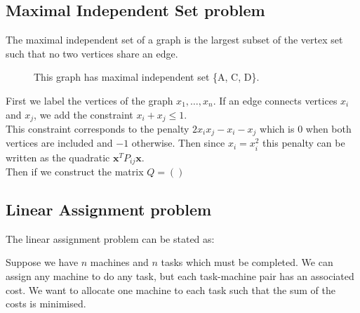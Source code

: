 \documentclass{article}
\begin{document}
\subsection{Maximal Independent Set problem}

\noindent The maximal independent set of a graph is the largest subset of the vertex set such that no two vertices share an edge. 

\begin{figure}[H]
    \centering
    \caption{This graph has maximal independent set \{A, C, D\}.}
\end{figure}

\noindent First we label the vertices of the graph \(x_1, \dots,  x_n\). If an edge connects vertices \(x_i\) and \(x_j\), we add the constraint \(x_i + x_j \leq 1\). \\

\noindent This constraint corresponds to the penalty \(2x_ix_j - x_i - x_j\) which is \(0\) when both vertices are included and \(-1\) otherwise. Then since \(x_i = x_i^2\) this penalty can be written as the quadratic \(\mathbf{x}^T P_{ij}\mathbf{x}\). \\

\noindent Then if we construct the matrix \(Q = ()\)

\subsection{Linear Assignment problem}

The linear assignment problem can be stated as:

Suppose we have \(n\) machines and \(n\) tasks which must be completed. We can assign any machine to do any task, but each task-machine pair has an associated cost. We want to allocate one machine to each task such that the sum of the costs is minimised. \\
\end{document}
